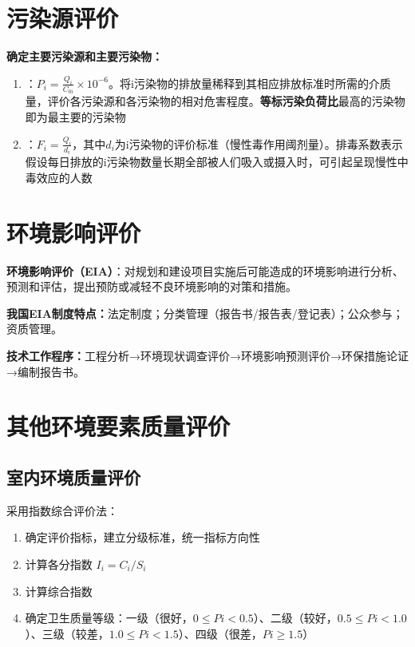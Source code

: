 \documentclass[10pt,a4paper,oneside]{ctexbook}
\begin{document}
\section{污染源评价}

\textbf{确定主要污染源和主要污染物：}
\begin{enumerate}[leftmargin=*]
    \item {}：$P_i = \frac{Q_i}{C_{0i}} \times 10^{-6}$。将i污染物的排放量稀释到其相应排放标准时所需的介质量，评价各污染源和各污染物的相对危害程度。\textbf{等标污染负荷比}最高的污染物即为最主要的污染物
    \item {}：$F_i = \frac{Q_i}{d_i}$，其中$d_i$为i污染物的评价标准（慢性毒作用阈剂量）。排毒系数表示假设每日排放的i污染物数量长期全部被人们吸入或摄入时，可引起呈现慢性中毒效应的人数
\end{enumerate}

\section{环境影响评价}

\begin{defbox}
\textbf{环境影响评价（EIA）}：对规划和建设项目实施后可能造成的环境影响进行分析、预测和评估，提出预防或减轻不良环境影响的对策和措施。
\end{defbox}

\textbf{我国EIA制度特点：}法定制度；分类管理（报告书/报告表/登记表）；公众参与；资质管理。

\textbf{技术工作程序：}工程分析→环境现状调查评价→环境影响预测评价→环保措施论证→编制报告书。

\section{其他环境要素质量评价}

\subsection{室内环境质量评价}
采用指数综合评价法：
\begin{enumerate}[leftmargin=*]
    \item 确定评价指标，建立分级标准，统一指标方向性
    \item 计算各分指数 $I_i = C_i / S_i$
    \item 计算综合指数
    \item 确定卫生质量等级：一级（很好，$0 \leq Pi < 0.5$）、二级（较好，$0.5 \leq Pi < 1.0$）、三级（较差，$1.0 \leq Pi < 1.5$）、四级（很差，$Pi \geq 1.5$）
\end{enumerate}
\end{document}
